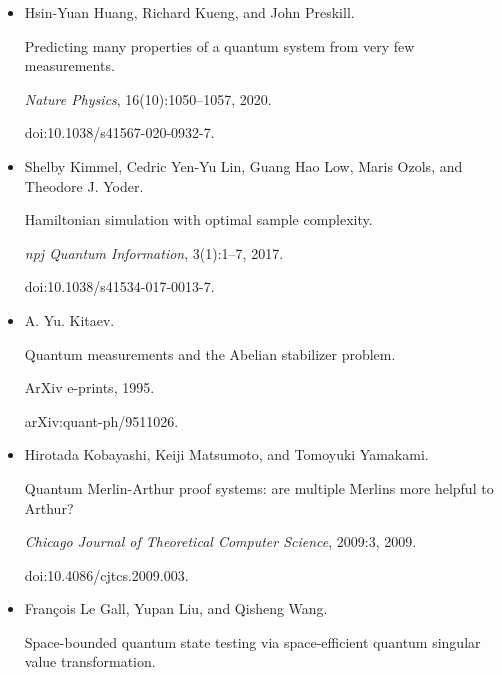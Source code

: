 \begin{itemize}
doi:10.1016/0047-259X(73)90028-6.





\item[] 
[25]

Hsin-Yuan Huang, Richard Kueng, and John Preskill.


Predicting many properties of a quantum system from very few
measurements.


\emph{Nature Physics}, 16(10):1050–1057, 2020.


doi:10.1038/s41567-020-0932-7.





\item[] 
[26]

Shelby Kimmel, Cedric Yen-Yu Lin, Guang Hao Low, Maris Ozols, and Theodore J.
Yoder.


Hamiltonian simulation with optimal sample complexity.


\emph{npj Quantum Information}, 3(1):1–7, 2017.


doi:10.1038/s41534-017-0013-7.





\item[] 
[27]

A. Yu. Kitaev.


Quantum measurements and the Abelian stabilizer problem.


ArXiv e-prints, 1995.


arXiv:quant-ph/9511026.





\item[] 
[28]

Hirotada Kobayashi, Keiji Matsumoto, and Tomoyuki Yamakami.


Quantum Merlin-Arthur proof systems: are multiple Merlins more
helpful to Arthur?


\emph{Chicago Journal of Theoretical Computer Science}, 2009:3, 2009.


doi:10.4086/cjtcs.2009.003.





\item[] 
[29]

François Le Gall, Yupan Liu, and Qisheng Wang.


Space-bounded quantum state testing via space-efficient quantum
singular value transformation.



\end{itemize}
